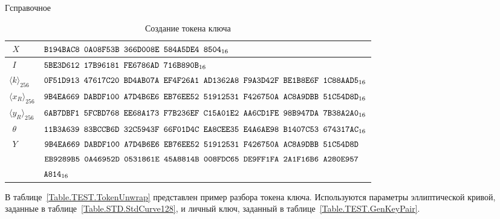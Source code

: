 \begin{appendix}{Г}{справочное}
\begin{table}[!h]
\caption{Создание токена ключа}\label{Table.TEST.TokenWrap}
{\small
\begin{tabular}{|l|l|}
%
\hline
$\phantom{\langle}X$ & 
$\texttt{B194BAC8~0A08F53B~366D008E~584A5DE4~8504}_{16}$\\
%
\hline
$\phantom{\langle}I$ & 
$\texttt{5BE3D612~17B96181~FE6786AD~716B890B}_{16}$\\
%
\hline
\hline
$\langle k\rangle_{256}$ & 
$\texttt{0F51D913~47617C20~BD4AB07A~EF4F26A1~AD1362A8~F9A3D42F~BE1B8E6F~1C88AAD5}_{16}$\\
%
\hline
$\langle x_R\rangle_{256}$ & 
$\texttt{9B4EA669~DABDF100~A7D4B6E6~EB76EE52~51912531~F426750A~AC8A9DBB~51C54D8D}_{16}$\\
%
\hline
$\langle y_R\rangle_{256}$ & 
$\texttt{6AB7DBF1~5FCBD768~EE68A173~F7B236EF~C15A01E2~AA6CD1FE~98B947DA~7B38A2A0}_{16}$\\
%
\hline
$\phantom{\langle}\theta$ & 
$\texttt{11B3A639~83BCCB6D~32C5943F~66F01D4C~EA8CEE35~E4A6AE98~B1407C53~674317AC}_{16}$\\
%
\dhline
$\phantom{\langle}Y$ & 
$\texttt{9B4EA669~DABDF100~A7D4B6E6~EB76EE52~51912531~F426750A~AC8A9DBB~51C54D8D}$\\
&
$\texttt{EB9289B5~0A46952D~0531861E~45A8814B~008FDC65~DE9FF1FA~2A1F16B6~A280E957}$\\
& 
$\texttt{A814}_{16}$\\
\hline
\end{tabular}
}
\end{table}

\label{TEST.TokenUnwrap}

В таблице~\ref{Table.TEST.TokenUnwrap} представлен пример разбора токена ключа.
%
Используются параметры эллиптической кривой, 
заданные в таблице~\ref{Table.STD.StdCurve128},
и личный ключ, заданный в таблице~\ref{Table.TEST.GenKeyPair}.

\clearpage


\end{appendix}
